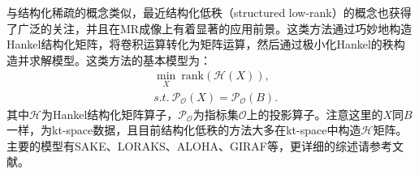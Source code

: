 与结构化稀疏的概念类似，最近结构化低秩（structured low-rank）的概念也获得了广泛的关注，并且在MR成像上有着显著的应用前景。这类方法通过巧妙地构造Hankel结构化矩阵，将卷积运算转化为矩阵运算，然后通过极小化Hankel的秩构造并求解模型。这类方法的基本模型为：
\begin{equation}
	\begin{aligned}
		&\min_X\  \mathrm{rank}(\mathcal{H}(X)),\\
		& s.t. \ \mathscr{P}_\mathcal{O}(X)=\mathscr{P}_\mathcal{O}(B).
	\end{aligned}
\end{equation}
其中$\mathcal{H}$为Hankel结构化矩阵算子，$\mathscr{P}_\mathcal{O}$为指标集$\mathcal{O}$上的投影算子。注意这里的$X$同$B$一样，为kt-space数据，且目前结构化低秩的方法大多在kt-space中构造$\mathcal{H}$矩阵。主要的模型有SAKE\cite{shin2014calibrationless}、LORAKS\cite{haldar2013low}、ALOHA\cite{jin2016general,lee2016acceleration}、GIRAF\cite{ongie2016off}等，更详细的综述请参考文献\cite{ye2019compressed}。

